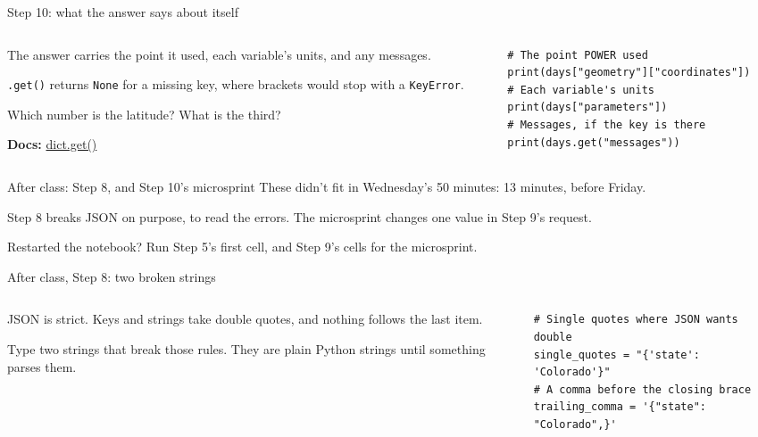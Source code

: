 \documentclass[9pt,aspectratio=169]{beamer}
\begin{document}
\begin{frame}[fragile]{Step 10: what the answer says about itself}
    \begin{columns}[T]
        \begin{column}{0.37\textwidth}
            The answer carries the point it used, each variable's units, and any messages.

            \medskip
            \texttt{.get()} returns \texttt{None} for a missing key, where brackets would stop with a \texttt{KeyError}.

            \medskip
            Which number is the latitude? What is the third?

            \medskip
            {\scriptsize\textbf{Docs:} \href{https://docs.python.org/3/library/stdtypes.html\#dict.get}{dict.get()}\par}
        \end{column}
        \begin{column}{0.6\textwidth}
\begin{lstlisting}
# The point POWER used
print(days["geometry"]["coordinates"])
# Each variable's units
print(days["parameters"])
# Messages, if the key is there
print(days.get("messages"))
\end{lstlisting}
        \end{column}
    \end{columns}
\end{frame}


\begin{frame}{After class: Step 8, and Step 10's microsprint}
    These didn't fit in Wednesday's 50 minutes: 13 minutes, before Friday.

    \medskip
    Step 8 breaks JSON on purpose, to read the errors. The microsprint changes one value in Step 9's request.

    \medskip
    Restarted the notebook? Run Step 5's first cell, and Step 9's cells for the microsprint.
\end{frame}

\begin{frame}[fragile]{After class, Step 8: two broken strings}
    \begin{columns}[T]
        \begin{column}{0.37\textwidth}
            JSON is strict. Keys and strings take double quotes, and nothing follows the last item.

            \medskip
            Type two strings that break those rules. They are plain Python strings until something parses them.
        \end{column}
        \begin{column}{0.6\textwidth}
\begin{lstlisting}
# Single quotes where JSON wants double
single_quotes = "{'state': 'Colorado'}"
# A comma before the closing brace
trailing_comma = '{"state": "Colorado",}'
\end{lstlisting}
        \end{column}
    \end{columns}
\end{frame}
\end{document}
